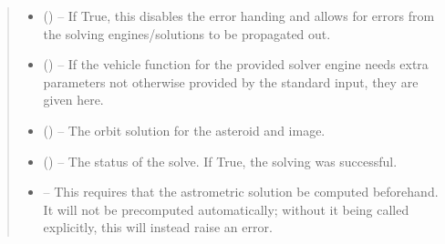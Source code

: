 \documentclass[letterpaper,11pt,english]{sphinxmanual}
\begin{document}
\begin{savenotes}
\begin{fulllineitems}
\begin{savenotes}
\begin{fulllineitems}
\begin{quote}
\begin{description}
\begin{itemize}
\item {} 
\sphinxAtStartPar
{} (\sphinxstyleliteralemphasis{\sphinxupquote{, }}) – If True, this disables the error handing and allows for errors from
the solving engines/solutions to be propagated out.

\item {} 
\sphinxAtStartPar
{} (\sphinxstyleliteralemphasis{\sphinxupquote{, }}) – If the vehicle function for the provided solver engine needs
extra parameters not otherwise provided by the standard input,
they are given here.

\end{itemize}

\sphinxAtStartPar
\begin{itemize}
\item {} 
\sphinxAtStartPar
{} () – The orbit solution for the asteroid and image.

\item {} 
\sphinxAtStartPar
{} () – The status of the solve. If True, the solving was successful.

\item {} 
\sphinxAtStartPar
{} – This requires that the astrometric solution be computed
before\sphinxhyphen{}hand. It will not be precomputed automatically; without it
being called explicitly, this will instead raise an error.

\end{itemize}


\end{description}\end{quote}

\end{fulllineitems}\end{savenotes}



\end{fulllineitems}
\end{savenotes}
\end{document}
